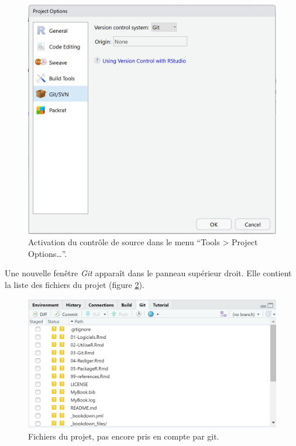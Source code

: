 \documentclass[
  12pt,
  french,
  a4paper,
  extrafontsizes,onecolumn,openright
  ]{memoir}
\begin{document}
\begin{figure}

{\centering \includegraphics[width=0.8\linewidth]{images/git-Project} 

}

\caption{Activation du contrôle de source dans le menu \enquote{Tools \textgreater{} Project Options\ldots{}}.}\label{fig:git-Project}
\end{figure}

\normalsize

Une nouvelle fenêtre \emph{Git} apparaît dans le panneau supérieur droit.
Elle contient la liste des fichiers du projet (figure \ref{fig:git-Fichiers}).



\scriptsize

\begin{figure}

{\centering \includegraphics[width=0.8\linewidth]{images/git-Fichiers} 

}

\caption{Fichiers du projet, pas encore pris en compte par git.}\label{fig:git-Fichiers}
\end{figure}
\end{document}
